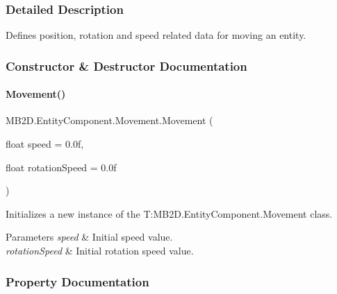 \subsubsection{Detailed Description}
Defines position, rotation and speed related data for moving an entity. 



\subsubsection{Constructor \& Destructor Documentation}
\hypertarget{class_m_b2_d_1_1_entity_component_1_1_movement_a12d8169b44077ab8683db91208d81542}{}\label{class_m_b2_d_1_1_entity_component_1_1_movement_a12d8169b44077ab8683db91208d81542} 
\paragraph{\texorpdfstring{Movement()}{Movement()}}
{\footnotesize\ttfamily M\+B2\+D.\+Entity\+Component.\+Movement.\+Movement (\begin{DoxyParamCaption}\item[{float}]{speed = {\ttfamily 0.0f},  }\item[{float}]{rotation\+Speed = {\ttfamily 0.0f} }\end{DoxyParamCaption})\hspace{0.3cm}{\ttfamily [inline]}}



Initializes a new instance of the T\+:\+M\+B2\+D.\+Entity\+Component.\+Movement class. 


\begin{DoxyParams}{Parameters}
{\em speed} & Initial speed value.\\
\hline
{\em rotation\+Speed} & Initial rotation speed value.\\
\hline
\end{DoxyParams}


\subsubsection{Property Documentation}
\hypertarget{class_m_b2_d_1_1_entity_component_1_1_movement_a289388b190b703874afecff7cd5ac450}{}\label{class_m_b2_d_1_1_entity_component_1_1_movement_a289388b190b703874afecff7cd5ac450} 
